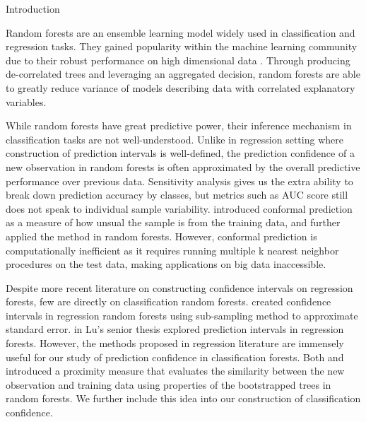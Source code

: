 \documentclass[12pt]{pom_thesis}
\begin{document}
\begin{chapter}{Introduction}
\label{Intro}

Random forests are an ensemble learning model widely used in classification and regression tasks. They gained popularity within the machine learning community due to their robust performance on high dimensional data  \citep{esli}. Through producing de-correlated trees and leveraging an aggregated decision, random forests are able to greatly reduce variance of models describing data with correlated explanatory variables.

While random forests have great predictive power, their inference mechanism in classification tasks are not well-understood. Unlike in regression setting where construction of prediction intervals is well-defined, the prediction confidence of a new observation in random forests is often approximated by the overall predictive performance over previous data. Sensitivity analysis gives us the extra ability to break down prediction accuracy by classes, but metrics such as AUC score still does not speak to individual sample variability. \cite{conformal} introduced conformal prediction as a measure of how unsual the sample is from the training data, and \cite{conformal_rf} further applied the method in random forests. However, conformal prediction is computationally inefficient as it requires running multiple k nearest neighbor procedures on the test data, making applications on big data inaccessible. 


Despite more recent literature on constructing confidence intervals on regression forests, few are directly on classification random forests. \cite{WagerJMLR} created confidence intervals in regression random forests using sub-sampling method to approximate standard error. \cite{JMLR}
in Lu's senior thesis explored prediction intervals in regression forests. However, the methods proposed in regression literature are immensely useful for our study of prediction confidence in classification forests. Both \cite{WagerJMLR} and \cite{JMLR} introduced a proximity measure that evaluates the similarity between the new observation and training data using properties of the bootstrapped trees in random forests. We further include this idea into our construction of classification confidence. 


\end{chapter}
\end{document}
